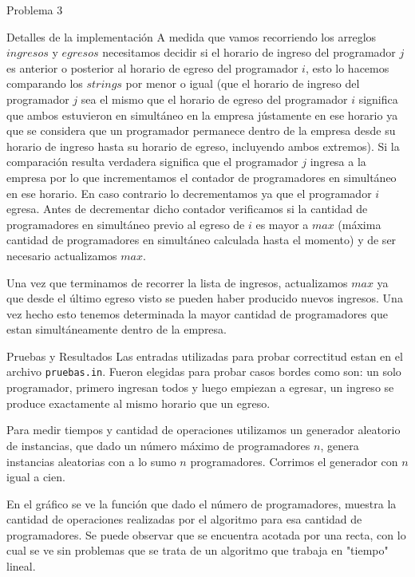 \begin{section}{Problema 3}
\begin{subsection}{Detalles de la implementación}
	A medida que vamos recorriendo los arreglos $ingresos$ y $egresos$ necesitamos decidir si el horario de ingreso del programador $j$ es anterior o posterior al horario de egreso del programador $i$, esto lo hacemos comparando los $strings$ por menor o igual (que el horario de ingreso del programador $j$ sea el mismo que el horario de egreso del programador $i$ significa que ambos estuvieron en simultáneo en la empresa jústamente en ese horario ya que se considera que un programador permanece dentro de la empresa desde su horario de ingreso hasta su horario de egreso, incluyendo ambos extremos). Si la comparación resulta verdadera significa que el programador $j$ ingresa a la empresa por lo que incrementamos el contador de programadores en simultáneo en ese horario. En caso contrario lo decrementamos ya que el programador $i$ egresa. Antes de decrementar dicho contador verificamos si la cantidad de programadores en simultáneo previo al egreso de $i$ es mayor a $max$ (máxima cantidad de programadores en simultáneo calculada hasta el momento) y de ser necesario actualizamos $max$.

	Una vez que terminamos de recorrer la lista de ingresos, actualizamos $max$ ya que desde el último egreso visto se pueden haber producido nuevos ingresos. Una vez hecho esto tenemos determinada la mayor cantidad de programadores que estan simultáneamente dentro de la empresa.
	\end{subsection}

	\begin{subsection}{Pruebas y Resultados}
	Las entradas utilizadas para probar correctitud estan en el archivo \texttt{pruebas.in}. Fueron elegidas para probar casos bordes como son: un solo programador, primero ingresan todos y luego empiezan a egresar, un ingreso se produce exactamente al mismo horario que un egreso.

	Para medir tiempos y cantidad de operaciones utilizamos un generador aleatorio de instancias, que dado un número máximo de programadores $n$, genera instancias aleatorias con a lo sumo $n$ programadores. Corrimos el generador con $n$ igual a cien.
		
	\VSP

	En el gráfico se ve la función que dado el número de programadores, muestra la cantidad de operaciones realizadas por el algoritmo para esa cantidad de programadores. Se puede observar que se encuentra acotada por una recta, con lo cual se ve sin problemas que se trata de un algoritmo que trabaja en "tiempo" lineal.
	

\end{subsection}
\end{section}
